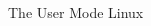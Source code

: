 \documentclass{beamer}
\begin{document}
\begin{CJK*}{UTF8}{bsmi}
    \begin{frame}{The User Mode Linux}
        \begin{multicols*}{2}

\end{multicols*}
\end{frame}
\end{CJK*}
\end{document}
